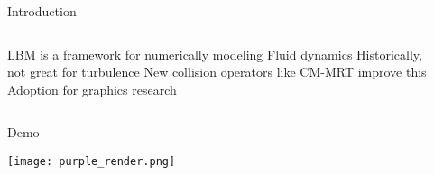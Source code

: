 \placelogofalse
\begin{frame}{Introduction}
\begin{columns}
\centering
\begin{outline}
  \1 LBM is a framework for numerically modeling Fluid dynamics
  \1 Historically, not great for turbulence
  \1 New collision operators like CM-MRT improve this
  \1 Adoption for graphics research \cite{Li2020, Li2024, Lyu2021}
\end{outline}

\begin{center}
\centering
{}

\end{center}
\end{columns}
\end{frame}
\placelogotrue

\placelogofalse
\begin{frame}{Demo}
  \begin{center}
  \centering
  \texttt{[image: purple\_render.png]}
  \end{center}
\end{frame}
\placelogotrue
